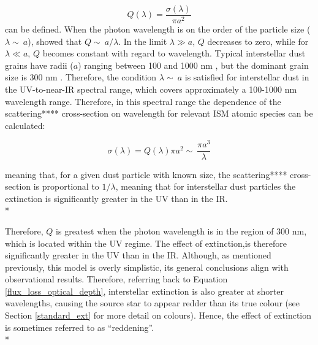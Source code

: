 \documentclass[12pt, a4paper]{report}
\begin{document}
\begin{equation}
Q(\lambda) = \frac{\sigma(\lambda)}{\pi a^{2}}
\label{ext_wavelength}
\end{equation}
can be defined. When the photon wavelength is on the order of the particle size ($\lambda \sim\ a$), \cite{1908AnP...330..377M} showed that $Q \sim\ a/\lambda$. In the limit $\lambda \gg a$, $Q$ decreases to zero, while for $\lambda \ll a$, $Q$ becomes constant with regard to wavelength. Typical interstellar dust grains have radii ($a$) ranging between 100 and 1000 nm \citep{2000JGR...10510299W}, but the dominant grain size is 300 nm \citep{2003JGRA..108.8030L}. Therefore, the condition $\lambda \sim\ a$ is satisfied for interstellar dust in the UV-to-near-IR spectral range, which covers approximately a 100-1000 nm wavelength range. Therefore, in this spectral range the dependence of the scattering**** cross-section on wavelength for relevant ISM atomic species can be calculated:

\begin{equation}
\sigma(\lambda) = Q(\lambda){\pi a^{2}} \sim\ \frac{\pi a^{3}}{\lambda}
\label{x_section_wavelength}
\end{equation}

meaning that, for a given dust particle with known size, the scattering**** cross-section is proportional to $1/\lambda$, meaning that for interstellar dust particles the extinction is significantly greater in the UV than in the IR. \\*


Therefore, $Q$ is greatest when the photon wavelength is in the region of 300 nm, which is located within the UV regime. The effect of extinction,is therefore significantly greater in the UV than in the IR. Although, as mentioned previously, this model is overly simplistic, its general conclusions align with observational results. Therefore, referring back to Equation \ref{flux_loss_optical_depth}, interstellar extinction is also greater at shorter wavelengths, causing the source star to appear redder than its true colour (see Section \ref{standard_ext} for more detail on colours). Hence, the effect of extinction is sometimes referred to as ``reddening''.\\* 

\end{document}
